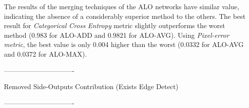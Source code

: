 % 

The results of the merging techniques of the ALO networks have similar value, indicating the absence of a considerably superior method to the others.
The best result for \textit{Categorical Cross Entropy} metric slightly outperforms the worst method (0.983 for ALO-ADD and 0.9821 for ALO-AVG).
Using \textit{Pixel-error metric}, the best value is only 0.004 higher than the worst (0.0332 for ALO-AVG and 0.0372 for ALO-MAX).

{\color{red}-------------------------------}

{\color{red}Removed Side-Outputs Contribution (Exists Edge Detect)}

{\color{red}-------------------------------}

